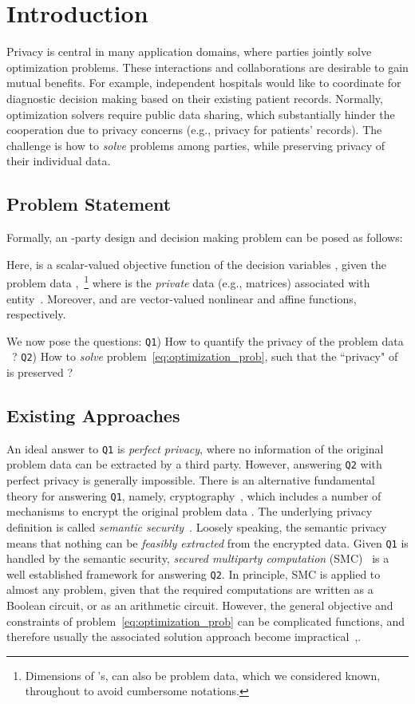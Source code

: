 \documentclass[12pt,draftcls,onecolumn]{IEEEtran}
\newcommand{\addnew}[1]{{{\color{blue!0!black}#1}}}
\begin{document}
\section{Introduction}
Privacy is central in many application domains, where parties jointly solve optimization problems. These interactions and collaborations are desirable to gain mutual benefits. For example, independent hospitals would like to coordinate for diagnostic decision making based on their existing patient records. Normally, optimization solvers require public data sharing, which substantially hinder the cooperation due to privacy concerns (e.g., privacy for patients' records). The challenge is how to \emph{solve} problems among parties, while preserving privacy of their individual data. \addnew
{
\subsection{Problem Statement}\label{subsec:problem_statement}
Formally, an -party design and decision making problem can be posed as follows:

Here,  is a scalar-valued objective function of the decision variables , given the problem data ,~\footnote{\addnew{Dimensions of 's, can also be problem data, which we considered known, throughout to avoid cumbersome notations.}} where  is the \emph{private} data (e.g., matrices) associated with entity~. Moreover,  and  are vector-valued nonlinear and affine functions, respectively.

We now pose the questions: \texttt{Q1}) How to quantify the privacy of the problem data ~? \texttt{Q2}) How to \emph{solve} problem~\eqref{eq:optimization_prob}, such that the ``privacy" of  is preserved ? 

}


\subsection{Existing Approaches}

\addnew
{
An ideal answer to \texttt{Q1} is \emph{perfect privacy}, where no information of the original problem data  can be extracted by a third party. However, answering \texttt{Q2} with perfect privacy is generally impossible. There is an alternative fundamental theory for answering \texttt{Q1}, namely, cryptography~\cite{Goldreich-book-2004}, which includes a number of mechanisms to encrypt the original problem data . The underlying privacy definition is called \emph{semantic security}~\cite[\S~5]{Goldreich-book-2004}. Loosely speaking, the semantic privacy means that nothing can be \emph{feasibly extracted} from the encrypted data. Given \texttt{Q1} is handled by the semantic security, \emph{secured multiparty computation} (SMC)~\cite{Yao-1982} is a well established framework for answering \texttt{Q2}. In principle, SMC is applied to almost any problem, given that the required computations are written as a Boolean circuit, or as an arithmetic circuit. However, the general objective and constraints of problem~\eqref{eq:optimization_prob} can be complicated functions, and therefore usually the associated solution approach become impractical~\cite{Damgard-06,Toft-2009},\cite[\S~2.3.2]{Bednarz-2012}.
}
\end{document}
